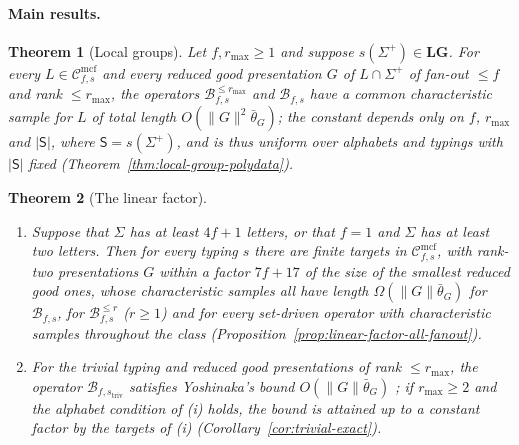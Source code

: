 \documentclass[11pt]{article}
\numberwithin{equation}{section}
\theoremstyle{plain}
\theoremstyle{definition}
\theoremstyle{remark}
\newcommand{\Cmcf}[2]{\mathcal{C}^{\mathrm{mcf}}_{#1,#2}}
\theoremstyle{plain}
\newtheorem{mainthm}{Theorem}
\begin{document}
\paragraph{Main results.}

\begin{mainthm}[Local groups]
\label{thm:A}
Let $f,r_{\max}\ge1$ and suppose $s(\Sigma^+)\in\mathbf{LG}$.  For every
$L\in\Cmcf{f}{s}$ and every reduced good presentation $G$ of $L\cap\Sigma^+$ of
fan-out $\le f$ and rank $\le r_{\max}$, the operators
$\mathcal B^{\le r_{\max}}_{f,s}$ and $\mathcal B_{f,s}$ have a common
characteristic sample for $L$ of total length $O(\|G\|^2\bar\theta_G)$; the
constant depends only on $f$, $r_{\max}$ and $|\mathsf S|$, where
$\mathsf S=s(\Sigma^+)$, and is thus uniform over alphabets and typings with
$|\mathsf S|$ fixed \textup(Theorem~\ref{thm:local-group-polydata}\textup).
\end{mainthm}

\begin{mainthm}[The linear factor]
\label{thm:B}
\begin{enumerate}[label=\textup{(\roman*)},leftmargin=*]
\item Suppose that $\Sigma$ has at least $4f+1$ letters, or that $f=1$ and
$\Sigma$ has at least two letters.  Then for every typing $s$ there are finite
targets in $\Cmcf{f}{s}$, with rank-two presentations $G$ within a factor
$7f+17$ of the size of the smallest reduced good ones, whose characteristic
samples all have length $\Omega(\|G\|\bar\theta_G)$ for $\mathcal B_{f,s}$, for
$\mathcal B^{\le r}_{f,s}$ \textup($r\ge1$\textup) and for every set-driven
operator with characteristic samples throughout the class
\textup(Proposition~\ref{prop:linear-factor-all-fanout}\textup).
\item For the trivial typing and reduced good presentations of rank
$\le r_{\max}$, the operator $\mathcal B_{f,s_{\mathrm{triv}}}$ satisfies
Yoshinaka's bound $O(\|G\|\bar\theta_G)$ \cite{Yoshinaka2011}; if
$r_{\max}\ge2$ and the alphabet condition of \textup{(i)} holds, the bound is
attained up to a constant factor by the targets of \textup{(i)}
\textup(Corollary~\ref{cor:trivial-exact}\textup).
\end{enumerate}
\end{mainthm}
\end{document}
